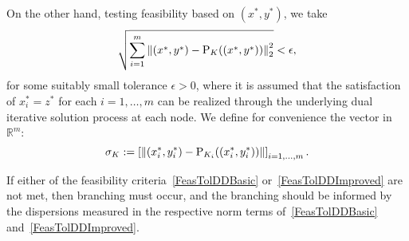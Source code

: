 On the other hand, testing feasibility based on $(x^*,y^*)$, we take
\begin{equation}\label{FeasTolDDImproved}
\sqrt{\sum_{i=1}^m \left \| (x^*,y^*)-\text{P}_K((x^*,y^*)) \right \|_2^2} < \epsilon,
\end{equation}
for some suitably small tolerance $\epsilon > 0$,
where it is assumed that the satisfaction of $x^*_i = z^*$ for each $i=1,\dots,m$ can be realized through the underlying dual iterative solution process at each node. We define for convenience the vector in $\mathbb{R}^m$:
$$
\sigma_K:=\left[\left \| (x_i^*,y_i^*)-\text{P}_{K_i}((x_i^*,y_i^*)) \right \| \right]_{i=1,\dots,m}.
$$

 If either of the feasibility criteria~\eqref{FeasTolDDBasic} or~\eqref{FeasTolDDImproved} are not met, then branching must occur, and the branching should be informed by the dispersions measured in the respective norm terms of~\eqref{FeasTolDDBasic} and~\eqref{FeasTolDDImproved}. 


